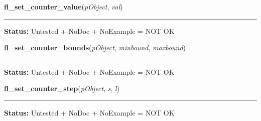     \label{xformslib:library:fl_set_counter_value}

    \vspace{0.5ex}

\hspace{.8\funcindent}\begin{boxedminipage}{\funcwidth}

    \raggedright \textbf{fl\_set\_counter\_value}(\textit{pObject}, \textit{val})

    \vspace{-1.5ex}

    \rule{\textwidth}{0.5\fboxrule}
\setlength{\parskip}{2ex}
\setlength{\parskip}{1ex}
\textbf{Status:} Untested + NoDoc + NoExample = NOT OK



    \end{boxedminipage}

    \label{xformslib:library:fl_set_counter_bounds}

    \vspace{0.5ex}

\hspace{.8\funcindent}\begin{boxedminipage}{\funcwidth}

    \raggedright \textbf{fl\_set\_counter\_bounds}(\textit{pObject}, \textit{minbound}, \textit{maxbound})

    \vspace{-1.5ex}

    \rule{\textwidth}{0.5\fboxrule}
\setlength{\parskip}{2ex}
\setlength{\parskip}{1ex}
\textbf{Status:} Untested + NoDoc + NoExample = NOT OK



    \end{boxedminipage}

    \label{xformslib:library:fl_set_counter_step}

    \vspace{0.5ex}

\hspace{.8\funcindent}\begin{boxedminipage}{\funcwidth}

    \raggedright \textbf{fl\_set\_counter\_step}(\textit{pObject}, \textit{s}, \textit{l})

    \vspace{-1.5ex}

    \rule{\textwidth}{0.5\fboxrule}
\setlength{\parskip}{2ex}
\setlength{\parskip}{1ex}
\textbf{Status:} Untested + NoDoc + NoExample = NOT OK



    \end{boxedminipage}

